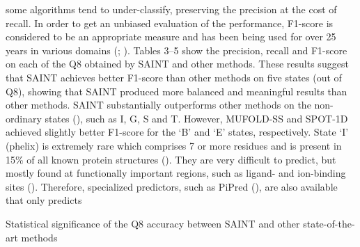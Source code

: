 \documentclass[8pt]{article}
\begin{document}
\begin{multicols}{2}
some algorithms tend to under-classify, preserving the precision at
the cost of recall. In order to get an unbiased evaluation of the performance, F1-score is considered to be an appropriate measure and
has been being used for over 25 years in various domains (\cite{prasetijo2017hoax}; \cite{sang2003introduction}). Tables 3–5
show the precision, recall and F1-score on each of the Q8 obtained
by SAINT and other methods. These results suggest that SAINT
achieves better F1-score than other methods on five states (out of
Q8), showing that SAINT produced more balanced and meaningful
results than other methods. SAINT substantially outperforms other
methods on the non-ordinary states (\cite{wang2016protein}), such as I,
G, S and T. However, MUFOLD-SS and SPOT-1D achieved slightly
better F1-score for the ‘B’ and ‘E’ states, respectively. State ‘I’ (phelix) is extremely rare which comprises 7 or more residues and is
present in 15\% of all known protein structures (\cite{ludwiczak2019pipred}). They are very difficult to predict, but mostly found at functionally important regions, such as ligand- and ion-binding sites
(\cite{ludwiczak2019pipred}). Therefore, specialized predictors, such as
PiPred (\cite{ludwiczak2019pipred}), are also available that only predicts

\begin{table}[H]   
\caption{Statistical significance of the Q8 accuracy between SAINT
and other state-of-the-art methods}
\hline
  \captionsetup{justification=left}
   

\caption*{Note: : The numbers of protein chains or domains in these datasets are
shown in parentheses. We show the P-values using a Wilcoxon signed-rank
test..}
    \label{tab:2}
\end{table}




\end{multicols}
\end{document}
